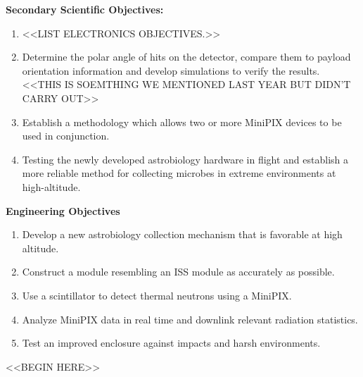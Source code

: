 {\bf Secondary Scientific Objectives:}
	\begin{enumerate}
	\item <<LIST ELECTRONICS OBJECTIVES.>>
	\item Determine the polar angle of hits on the detector, compare them to payload orientation information and develop simulations to verify the results. <<THIS IS SOEMTHING WE MENTIONED LAST YEAR BUT DIDN'T CARRY OUT>>
        \item Establish a methodology which allows two or more MiniPIX devices to be used in conjunction.
	\item Testing the newly developed astrobiology hardware in flight and establish a more reliable method for collecting microbes in extreme environments at high-altitude.
	\end{enumerate}


{\bf Engineering Objectives}
	\begin{enumerate}
        \item Develop a new astrobiology collection mechanism that is favorable at high altitude.
        \item Construct a module resembling an ISS module as accurately as possible.
        \item Use a scintillator to detect thermal neutrons using a MiniPIX.
	\item Analyze MiniPIX data in real time and downlink relevant radiation statistics.
	\item Test an improved enclosure against impacts and harsh environments.
	\end{enumerate}


        

<<BEGIN HERE>>
        
